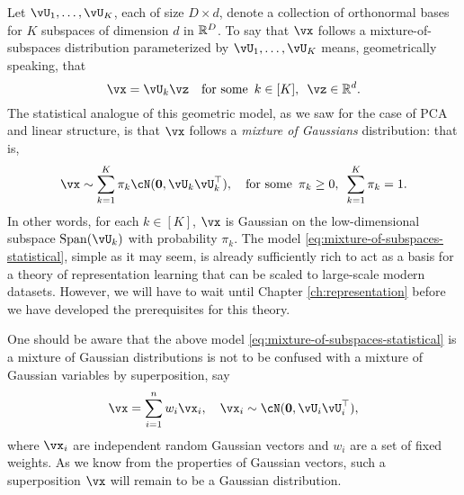 \documentclass[../../book-main.tex]{subfiles}
\begin{document}
Let $\vU_1, \dots, \vU_K$, each of size $D \times d$, denote a collection of orthonormal bases for $K$ subspaces of dimension $d$ in $\mathbb{R}^D$.
To say that $\vx$ follows a mixture-of-subspaces distribution parameterized by $\vU_1, \dots, \vU_K$ means, geometrically speaking,
that 
\begin{equation}\label{eq:mixture-of-subspaces-geometric}
    \vx = \vU_k \vz  \quad \text{for some} \enspace k \in [K],\enspace \vz \in \R^d.
\end{equation}
The statistical analogue of this geometric model, as we saw for the case of PCA and linear structure,
is that $\vx$ follows a \textit{mixture of Gaussians} distribution: that is,
\begin{equation}\label{eq:mixture-of-subspaces-statistical}
    \vx \sim \sum_{k=1}^K \pi_k \cN(\mathbf{0}, \vU_k\vU_k^\top), \quad \text{for some} \enspace \pi_k \geq 0,\enspace \sum_{k=1}^K \pi_k = 1.
\end{equation}
In other words, for each $k \in [K]$, $\vx$ is Gaussian on the low-dimensional subspace $\Span(\vU_k)$  with probability $\pi_k$.
The model \eqref{eq:mixture-of-subspaces-statistical}, simple as it may seem, is already sufficiently rich to act as a basis for a theory of representation learning that can be scaled to large-scale modern datasets. However, we will have to wait until Chapter \ref{ch:representation} before we have developed the prerequisites for this theory. 

\begin{remark}
One should be aware that the above model \eqref{eq:mixture-of-subspaces-statistical} is a mixture of Gaussian distributions is not to be confused with a mixture of Gaussian variables by superposition, say 
\begin{equation}
    \vx = \sum_{i=1}^n w_i \vx_i, \quad \vx_i \sim \cN(\mathbf{0}, \vU_i\vU_i^\top),
\end{equation}
where $\vx_i$ are independent random Gaussian vectors and $w_i$ are a set of fixed weights. As we know from the properties of Gaussian vectors, such a superposition $\vx$ will remain to be a Gaussian distribution.
\end{remark}
\end{document}
